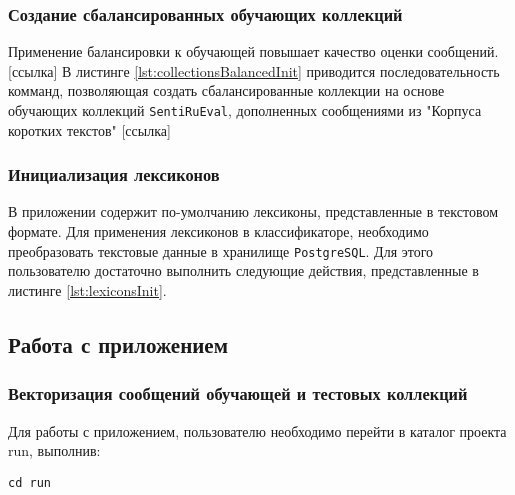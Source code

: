         \subsubsection{Создание сбалансированных обучающих коллекций}
        Применение балансировки к обучающей повышает качество оценки сообщений. [ссылка]
        В листинге \ref{lst:collectionsBalancedInit} приводится последовательность
        комманд, позволяющая создать сбалансированные коллекции на основе обучающих
        коллекций {\tt SentiRuEval}, дополненных сообщениями из "Корпуса коротких текстов" [ссылка]
        \lstset{style=bash}
        

        \subsubsection{Инициализация лексиконов}
        В приложении содержит по-умолчанию лексиконы, представленные в текстовом
        формате. Для применения лексиконов в классификаторе, необходимо преобразовать
        текстовые данные в хранилище {\tt PostgreSQL}. Для этого пользователю
        достаточно выполнить следующие действия, представленные в листинге \ref{lst:lexiconsInit}.
        \lstset{style=bash}
        

    \subsection{Работа с приложением}
        \subsubsection{Векторизация сообщений обучающей и тестовых коллекций}
        \label{sec:usage_vectorize}
        Для работы с приложением, пользователю необходимо перейти в каталог проекта {run},
        выполнив:
        \begin{center}
            {\tt cd run}
        \end{center}

